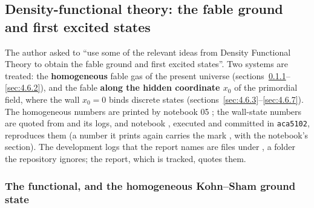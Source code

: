 \subsection{Density-functional theory: the fable ground and first excited states}
\label{sec:4.6}

The author asked to ``use some of the relevant ideas from Density Functional Theory to obtain the fable
ground and first excited states''. Two systems are treated: the \textbf{homogeneous} fable gas of the
present universe (sections~\ref{sec:4.6.1}--\ref{sec:4.6.2}), and the fable \textbf{along the hidden
coordinate $x_0$} of the primordial field, where the wall $x_0=0$ binds discrete states
(sections~\ref{sec:4.6.3}--\ref{sec:4.6.7}). The homogeneous numbers are printed by notebook 05
; the wall-state numbers are quoted from
  and its logs, and notebook
, executed and committed in \texttt{aca5102}, reproduces them (a number it
prints again carries the mark , with the notebook's section). The development logs that the report names are files under
, a folder the repository ignores; the report, which is tracked, quotes
them.

\subsubsection{The functional, and the homogeneous Kohn--Sham ground state}
\label{sec:4.6.1}

